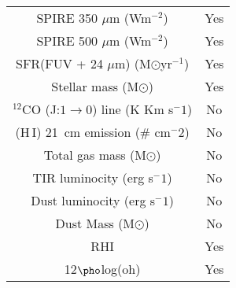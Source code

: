 \begin{table}
\begin{tabular}{ |c|c| }
SPIRE 350 $\mu$m (Wm$^{-2}$)& Yes\\
SPIRE 500 $\mu$m (Wm$^{-2}$)& Yes\\
SFR(FUV + 24 $\mu$m) (M$\odot$yr$^{-1}$) & Yes\\
Stellar mass (M$\odot$)& Yes\\
$^{12}$CO (J:$1\rightarrow0$) line (K Km s$^-1$) & No \\
(H\,{\sc I}) 21~cm emission (# cm$^-2$) & No \\
Total gas mass (M$\odot$) & No \\
TIR luminocity (erg s$^-1$) & No \\
Dust luminocity (erg s$^-1$) & No \\
Dust Mass (M$\odot$)& No\\
RHI & Yes\\
12$\pho$log(oh)& Yes\\
\hline
\end{tabular}
\end{table}